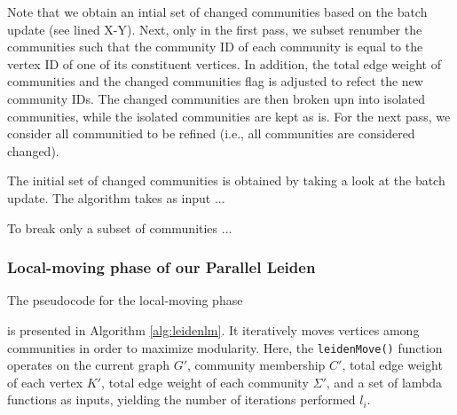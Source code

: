 Note that we obtain an intial set of changed communities based on the batch update (see lined X-Y). Next, only in the first pass, we subset renumber the communities such that the community ID of each community is equal to the vertex ID of one of its constituent vertices. In addition, the total edge weight of communities and the changed communities flag is adjusted to refect the new community IDs. The changed communities are then broken upn into isolated communities, while the isolated communities are kept as is. For the next pass, we consider all communitied to be refined (i.e., all communities are considered changed).

The initial set of changed communities is obtained by taking a look at the batch update. The algorithm takes as input ...

To break only a subset of communities ...


\subsubsection{Local-moving phase of our Parallel Leiden}

The pseudocode for the local-moving phase is presented in Algorithm \ref{alg:leidenlm}. It iteratively moves vertices among communities in order to maximize modularity. Here, the \texttt{leidenMove()} function operates on the current graph $G'$, community membership $C'$, total edge weight of each vertex $K'$, total edge weight of each community $\Sigma'$, and a set of lambda functions as inputs, yielding the number of iterations performed $l_i$.




